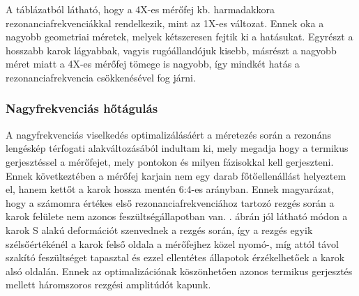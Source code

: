 \begin{table}[!ht]
    \centering
    \caption{A mérőfejek első öt rezonanciafrekvenciája}
    \label{tab:resonant}
\end{table}

A táblázatból látható, hogy a 4X-es mérőfej kb. harmadakkora rezonanciafrekvenciákkal rendelkezik, mint az 1X-es változat. Ennek oka a nagyobb geometriai méretek, melyek kétszeresen fejtik ki a hatásukat. Egyrészt a hosszabb karok lágyabbak, vagyis rugóállandójuk kisebb, másrészt a nagyobb méret miatt a 4X-es mérőfej tömege is nagyobb, így mindkét hatás a rezonanciafrekvencia csökkenésével fog járni.

\subsubsection{Nagyfrekvenciás hőtágulás}

A nagyfrekvenciás viselkedés optimalizálásáért a méretezés során a rezonáns lengéskép térfogati alakváltozásából indultam ki, mely megadja hogy a termikus gerjesztéssel a mérőfejet, mely pontokon és milyen fázisokkal kell gerjeszteni. Ennek következtében a mérőfej karjain nem egy darab főtőellenállást helyeztem el, hanem kettőt a karok hossza mentén 6:4-es arányban. Ennek magyarázat, hogy a számomra értékes első rezonanciafrekvenciához tartozó rezgés során a karok felülete nem azonos feszültségállapotban van. . ábrán jól látható módon a karok S alakú deformációt szenvednek a rezgés során, így a rezgés egyik szélsőértékénél a karok felső oldala a mérőfejhez közel nyomó-, míg attól távol szakító feszültséget tapasztal és ezzel ellentétes állapotok érzékelhetőek a karok alsó oldalán. Ennek az optimalizációnak köszönhetően azonos termikus gerjesztés mellett háromszoros rezgési amplitúdót kapunk.

